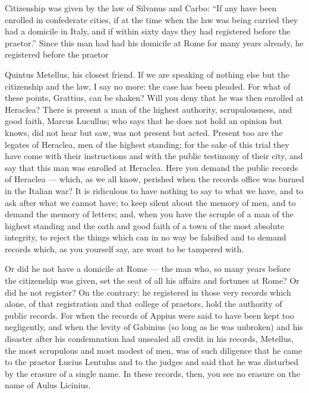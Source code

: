  Citizenship was given by the law of Silvanus and Carbo: ``If any have been enrolled in confederate cities, if at the time when the law was being carried they had a domicile in Italy, and if within sixty days they had registered before the praetor.'' Since this man had had his domicile at Rome for many years already, he registered before the praetor

 Quintus Metellus, his closest friend. If we are speaking of nothing else but the citizenship and the law, I say no more: the case has been pleaded. For what of these points, Grattius, can be shaken? Will you deny that he was then enrolled at Heraclea? There is present a man of the highest authority, scrupulousness, and good faith, Marcus Lucullus; who says that he does not hold an opinion but knows, did not hear but saw, was not present but acted. Present too are the legates of Heraclea, men of the highest standing; for the sake of this trial they have come with their instructions and with the public testimony of their city, and say that this man was enrolled at Heraclea. Here you demand the public records of Heraclea --- which, as we all know, perished when the records office was burned in the Italian war? It is ridiculous to have nothing to say to what we have, and to ask after what we cannot have; to keep silent about the memory of men, and to demand the memory of letters; and, when you have the scruple of a man of the highest standing and the oath and good faith of a town of the most absolute integrity, to reject the things which can in no way be falsified and to demand records which, as you yourself say, are wont to be tampered with.

 Or did he not have a domicile at Rome --- the man who, so many years before the citizenship was given, set the seat of all his affairs and fortunes at Rome? Or did he not register? On the contrary: he registered in those very records which alone, of that registration and that college of praetors, hold the authority of public records. For when the records of Appius were said to have been kept too negligently, and when the levity of Gabinius (so long as he was unbroken) and his disaster after his condemnation had unsealed all credit in his records, Metellus, the most scrupulous and most modest of men, was of such diligence that he came to the praetor Lucius Lentulus and to the judges and said that he was disturbed by the erasure of a single name. In these records, then, you see no erasure on the name of Aulus Licinius.

